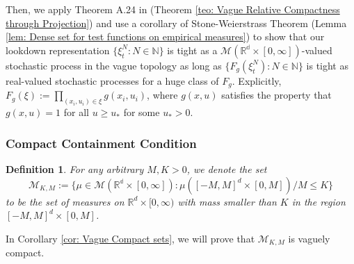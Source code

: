 \documentclass[12pt]{article}
\newtheorem{definition}[theorem]{Definition}
\newcommand{\IR}{\mathbb R}
\begin{document}
Then, we apply Theorem A.24 in \cite{kallenberg1997foundations}
(Theorem \ref{teo: Vague Relative Compactness through Projection})
and use a corollary of Stone-Weierstrass Theorem
(Lemma \ref{lem: Dense set for test functions on empirical measures})
to show that our lookdown representation $\{\xi^N_t: N \in \mathbb{N}\}$ is tight
as a $\mathcal{M}(\mathbb{R^d} \times [0, \infty])$-valued stochastic process
in the vague topology
as long as $\{F_g(\xi^N_t): N \in \mathbb{N}\}$ is tight
as real-valued stochastic processes for a huge class of $F_g$. 
Explicitly, $F_g(\xi):= \prod_{(x_i,u_i)\in \xi}g(x_i,u_i)$,
where $g(x,u)$ satisfies the property that
$g(x,u) = 1 $
for all $u \geq u_{*}$ for some $u_{*}>0$.

\subsubsection{Compact Containment Condition}
\begin{definition}
For any arbitrary $M,K>0$, 
we denote the set 
$$\mathcal{M}_{K,M}:= \{\mu \in \mathcal{M}(\mathbb{R^d} \times [0, \infty]): \mu([-M,M]^d \times [0,M])/M \leq K\}$$
to be the set of measures on $\IR^d \times[0,\infty)$ with mass smaller than $K$ in the region $[-M,M]^d \times [0,M]$.
\end{definition}

In Corollary \ref{cor: Vague Compact sets}, we will prove that $\mathcal{M}_{K,M}$ is vaguely compact. 
\end{document}
